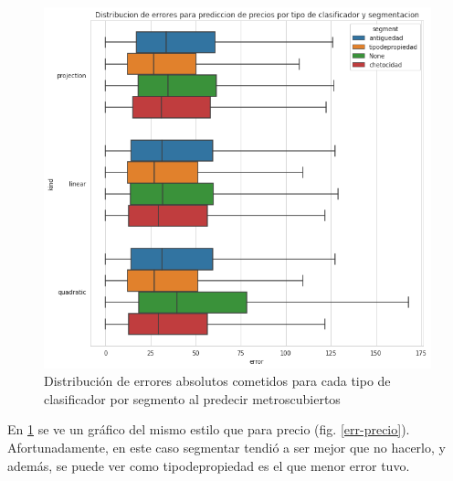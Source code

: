 \begin{figure}[H]
    \centering
    \includegraphics[scale=0.5]{img/cmp/metroscubiertos/err-por-kind-seg.png}
    \caption{Distribución de errores absolutos cometidos para cada tipo de clasificador por segmento al predecir metroscubiertos}
    \label{err-m2}
\end{figure}

En \ref{err-m2} se ve un gráfico del mismo estilo que para precio (fig. \ref{err-precio}). Afortunadamente, en este caso segmentar tendió a ser mejor que no hacerlo, y además, se puede ver como tipodepropiedad es el que menor error tuvo.